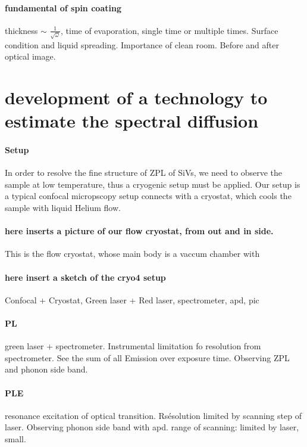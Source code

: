 \paragraph{fundamental of spin coating} thickness $\sim$ $\frac{1}{\sqrt{\omega}}$, time of evaporation, single time or multiple times. Surface condition and liquid spreading. Importance of clean room. Before and after optical image.
\section[development of a technology to estimate the spectral diffusion]{development of a technology to estimate the spectral diffusion}

\paragraph{Setup} 

In order to resolve the fine structure of ZPL of SiVs, we need to observe the sample at low temperature, thus a cryogenic setup must be applied.
Our setup is a typical confocal micropscopy setup connects with a cryostat, which cools the sample with liquid Helium flow.

\paragraph{here inserts a picture of our flow cryostat, from out and in side.}
This is the flow cryostat, whose main body is a vaccum chamber with

\paragraph{here insert a sketch of the cryo4 setup}
Confocal + Cryostat, Green laser + Red laser, spectrometer, apd, pic


\paragraph{PL} green laser + spectrometer. Instrumental limitation fo resolution from spectrometer. See the sum of all Emission over exposure time. Observing ZPL and phonon side band.

\paragraph{PLE} resonance excitation of optical transition. Rsésolution limited by scanning step of laser. Observing phonon side band with apd. range of scanning: limited by laser, small.

